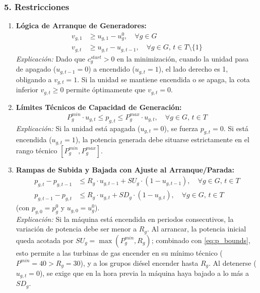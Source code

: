 \documentclass[10pt,letterpaper]{article}
\begin{document}
\subsubsection*{5. Restricciones}
\begin{enumerate}[label=\textbf{R\arabic*.}]
    \item \textbf{Lógica de Arranque de Generadores:}
    \begin{align}
        v_{g,1} &\ge u_{g,1} - u_g^0, \quad \forall g \in G \label{eq:startup_t1} \\
        v_{g,t} &\ge u_{g,t} - u_{g,t-1}, \quad \forall g \in G, \, t \in T \setminus \{1\} \label{eq:startup_t}
    \end{align}
    \textit{Explicación:} Dado que $c_g^{start} > 0$ en la minimización, cuando la unidad pasa de apagado ($u_{g,t-1}=0$) a encendido ($u_{g,t}=1$), el lado derecho es 1, obligando a $v_{g,t}=1$. Si la unidad se mantiene encendida o se apaga, la cota inferior $v_{g,t} \ge 0$ permite óptimamente que $v_{g,t}=0$.
    
    \item \textbf{Límites Técnicos de Capacidad de Generación:}
    \begin{equation}
        P_g^{min} \cdot u_{g,t} \le p_{g,t} \le P_g^{max} \cdot u_{g,t}, \quad \forall g \in G, \, t \in T \label{eq:p_bounds}
    \end{equation}
    \textit{Explicación:} Si la unidad está apagada ($u_{g,t}=0$), se fuerza $p_{g,t}=0$. Si está encendida ($u_{g,t}=1$), la potencia generada debe situarse estrictamente en el rango técnico $[P_g^{min}, P_g^{max}]$.
    
    \item \textbf{Rampas de Subida y Bajada con Ajuste al Arranque/Parada:}
    \begin{align}
        p_{g,t} - p_{g,t-1} &\le R_g \cdot u_{g,t-1} + SU_g \cdot (1 - u_{g,t-1}), \quad \forall g \in G, \, t \in T \label{eq:ramp_up} \\
        p_{g,t-1} - p_{g,t} &\le R_g \cdot u_{g,t} + SD_g \cdot (1 - u_{g,t}), \quad \forall g \in G, \, t \in T \label{eq:ramp_down}
    \end{align}
    (con $p_{g,0} = p_g^0$ y $u_{g,0} = u_g^0$). \\
    \textit{Explicación:} Si la máquina está encendida en periodos consecutivos, la variación de potencia debe ser menor a $R_g$. Al arrancar, la potencia inicial queda acotada por $SU_g = \max(P_g^{min}, R_g)$; combinado con \eqref{eq:p_bounds}, esto permite a las turbinas de gas encender en su mínimo técnico ($P^{min}=40 > R_g=30$), y a los grupos diésel encender hasta $R_g$. Al detenerse ($u_{g,t}=0$), se exige que en la hora previa la máquina haya bajado a lo más a $SD_g$.
    

\end{enumerate}
\end{document}

